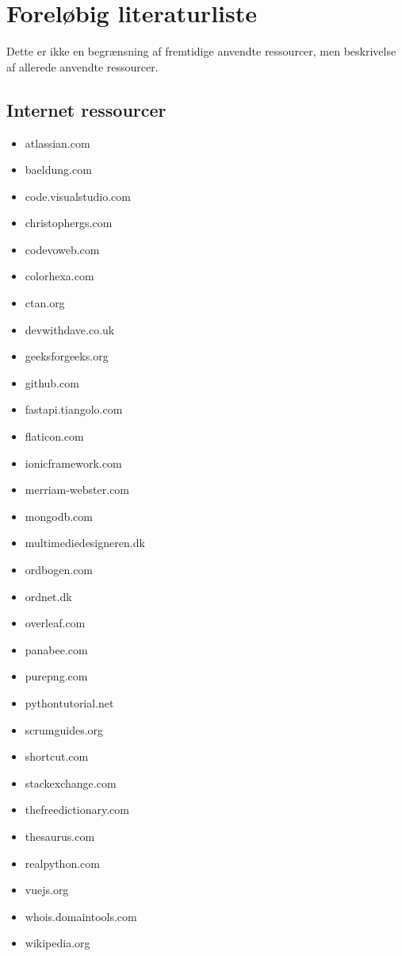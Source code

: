 \documentclass{report}
\begin{document}
\clearpage

\appendix
\renewcommand{\thechapter}{\Alph{chapter}}

\chapter{Foreløbig literaturliste}

Dette er ikke en begrænsning af fremtidige anvendte ressourcer, men beskrivelse af allerede anvendte ressourcer.

\section{Internet ressourcer}
\begin{itemize}
\item atlassian.com
\item baeldung.com
\item code.visualstudio.com
\item christophergs.com
\item codevoweb.com
\item colorhexa.com
\item ctan.org
\item devwithdave.co.uk
\item geeksforgeeks.org
\item github.com
\item fastapi.tiangolo.com
\item flaticon.com
\item ionicframework.com
\item merriam-webster.com
\item mongodb.com
\item multimediedesigneren.dk
\item ordbogen.com
\item ordnet.dk
\item overleaf.com
\item panabee.com
\item purepng.com
\item pythontutorial.net
\item scrumguides.org
\item shortcut.com
\item stackexchange.com
\item thefreedictionary.com
\item thesaurus.com
\item realpython.com
\item vuejs.org
\item whois.domaintools.com
\item wikipedia.org
\end{itemize}

	
\end{document}

